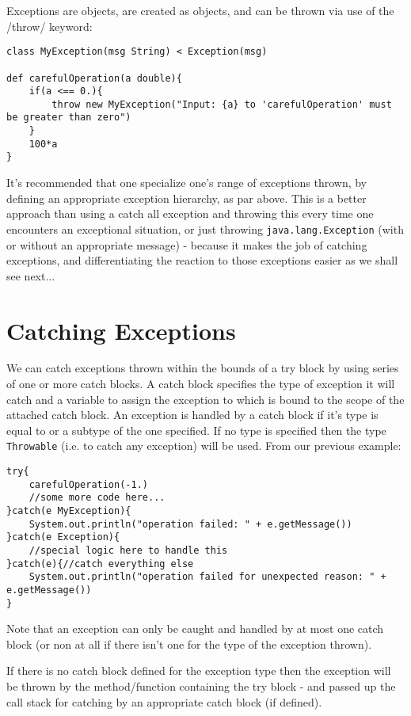 \documentclass[conc-doc]{subfiles}
\begin{document}
Exceptions are objects, are created as objects, and can be thrown via use of the /throw/ keyword:
\begin{lstlisting}
class MyException(msg String) < Exception(msg)

def carefulOperation(a double){
	if(a <== 0.){
		throw new MyException("Input: {a} to 'carefulOperation' must be greater than zero")
	}
	100*a
}
\end{lstlisting}

It's recommended that one specialize one's range of exceptions thrown, by defining an appropriate exception hierarchy, as par above. This is a better approach than using a catch all exception and throwing this every time one encounters an exceptional situation, or just throwing \lstinline{java.lang.Exception} (with or without an appropriate message) - because it makes the job of catching exceptions, and differentiating the reaction to those exceptions easier as we shall see next...

\section{Catching Exceptions}
We can catch exceptions thrown within the bounds of a try block by using series of one or more catch blocks. A catch block specifies the type of exception it will catch and a variable to assign the exception to which is bound to the scope of the attached catch block. An exception is handled by a catch block if it's type is equal to or a subtype of the one specified. If no type is specified then the type \lstinline{Throwable} (i.e. to catch any exception) will be used. From our previous example:

\begin{lstlisting}
try{
	carefulOperation(-1.)
	//some more code here...
}catch(e MyException){
	System.out.println("operation failed: " + e.getMessage())
}catch(e Exception){
	//special logic here to handle this
}catch(e){//catch everything else
	System.out.println("operation failed for unexpected reason: " + e.getMessage())
}
\end{lstlisting}

Note that an exception can only be caught and handled by at most one catch block (or non at all if there isn't one for the type of the exception thrown).

If there is no catch block defined for the exception type then the exception will be thrown by the method/function containing the try block - and passed up the call stack for catching by an appropriate catch block (if defined).
\end{document}
